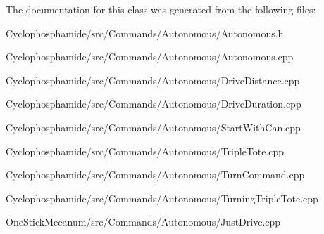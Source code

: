 The documentation for this class was generated from the following files\+:\begin{DoxyCompactItemize}
\item 
Cyclophosphamide/src/\+Commands/\+Autonomous/Autonomous.\+h\item 
Cyclophosphamide/src/\+Commands/\+Autonomous/Autonomous.\+cpp\item 
Cyclophosphamide/src/\+Commands/\+Autonomous/Drive\+Distance.\+cpp\item 
Cyclophosphamide/src/\+Commands/\+Autonomous/Drive\+Duration.\+cpp\item 
Cyclophosphamide/src/\+Commands/\+Autonomous/Start\+With\+Can.\+cpp\item 
Cyclophosphamide/src/\+Commands/\+Autonomous/Triple\+Tote.\+cpp\item 
Cyclophosphamide/src/\+Commands/\+Autonomous/Turn\+Command.\+cpp\item 
Cyclophosphamide/src/\+Commands/\+Autonomous/Turning\+Triple\+Tote.\+cpp\item 
One\+Stick\+Mecanum/src/\+Commands/\+Autonomous/Just\+Drive.\+cpp\end{DoxyCompactItemize}
